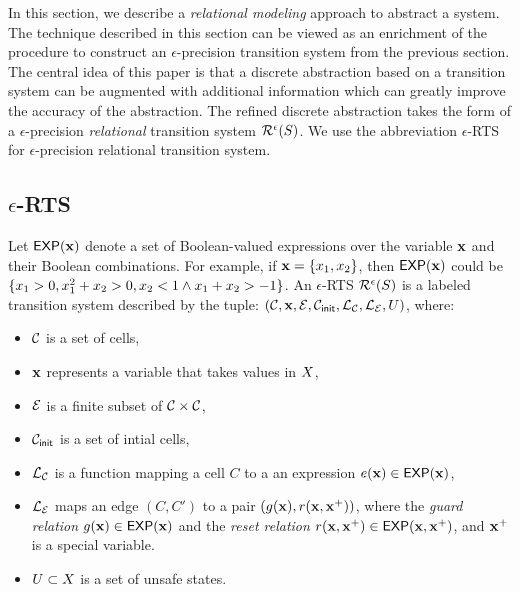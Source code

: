 In this section, we describe a {\em relational modeling} approach to
abstract a system. The technique described in this section can be
viewed as an enrichment of the procedure to construct an
$\epsilon$-precision transition system from the previous section.  The
central idea of this paper is that a discrete abstraction based on a
transition system can be augmented with additional information which
can greatly improve the accuracy of the abstraction. The refined
discrete abstraction takes the form of a $\epsilon$-precision {\em
relational} transition system $\mathcal{R}^{\epsilon}(S)$. We
use the abbreviation $\epsilon$-RTS for $\epsilon$-precision
relational transition system.

\subsection{$\epsilon$-RTS}
Let $\mathsf{EXP}(\mathbf{x})$ denote a set of Boolean-valued expressions over the
variable $\mathbf{x}$ and their Boolean combinations.  For example, if $\mathbf{x} =
\{x_1,x_2\}$, then $\mathsf{EXP}(\mathbf{x})$ could be $\{ x_1 > 0, x^2_1
+ x_2 > 0, x_2 < 1 \wedge x_1 + x_2 > -1\}$.  An $\epsilon$-RTS
$\mathcal{R}^{\epsilon}(S)$ is a labeled transition system
described by the tuple:
$(\mathcal{C},\mathbf{x},\mathcal{E},\mathcal{C}_{\mathsf{init}},\mathcal{L}_\mathcal{C},
\mathcal{L}_\mathcal{E},U)$, where:

\begin{itemize}[label=--,leftmargin=1em,labelsep=*]
\item
$\mathcal{C}$ is a set of cells,
\item
$\mathbf{x}$ represents a variable that takes values in $X$,
\item
$\mathcal{E}$ is a finite subset of $\mathcal{C} \times \mathcal{C}$,
\item
$\mathcal{C}_{\mathsf{init}}$ is a set of intial cells,
\item
$\mathcal{L}_\mathcal{C}$ is a function mapping a cell $C$ to a
an expression $e(\mathbf{x}) \in \mathsf{EXP}(\mathbf{x})$,
\item
$\mathcal{L}_\mathcal{E}$ maps an edge $(C,C')$ to a pair $(g(\mathbf{x}),
r(\mathbf{x},\mathbf{x}^{+}))$, where the {\em guard relation} $g(\mathbf{x}) \in \mathsf{EXP}(\mathbf{x})$
and the {\em reset relation} $r(\mathbf{x},\mathbf{x}^{+}) \in \mathsf{EXP}(\mathbf{x},\mathbf{x}^{+})$, and
$\mathbf{x}^{+}$ is a special variable.
\item
$U \subset X$ is a set of unsafe states.
\end{itemize}


